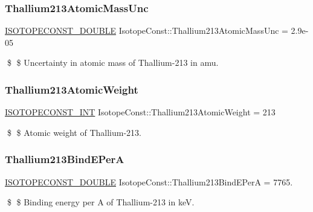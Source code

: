 \subsubsection{\texorpdfstring{Thallium213\+Atomic\+Mass\+Unc}{Thallium213AtomicMassUnc}}
{\footnotesize\ttfamily \mbox{\hyperlink{group___isotope_const-_macros_ga8f45a7272ce02c0b4c65c44636ed719a}{I\+S\+O\+T\+O\+P\+E\+C\+O\+N\+S\+T\+\_\+\+D\+O\+U\+B\+LE}} Isotope\+Const\+::\+Thallium213\+Atomic\+Mass\+Unc = 2.\+9e-\/05}

\$ \$ Uncertainty in atomic mass of Thallium-\/213 in amu. \mbox{\label{group___isotope_const-_thallium-_tl213_ga4a7ad94dc850814df657d40d5abe8f88}} 
\subsubsection{\texorpdfstring{Thallium213\+Atomic\+Weight}{Thallium213AtomicWeight}}
{\footnotesize\ttfamily \mbox{\hyperlink{group___isotope_const-_macros_ga5f18360b3e99483a35c32d789e62621c}{I\+S\+O\+T\+O\+P\+E\+C\+O\+N\+S\+T\+\_\+\+I\+NT}} Isotope\+Const\+::\+Thallium213\+Atomic\+Weight = 213}

\$ \$ Atomic weight of Thallium-\/213. \mbox{\label{group___isotope_const-_thallium-_tl213_ga40fa2023660bf8ea2247f623b7a4becc}} 
\subsubsection{\texorpdfstring{Thallium213\+Bind\+E\+PerA}{Thallium213BindEPerA}}
{\footnotesize\ttfamily \mbox{\hyperlink{group___isotope_const-_macros_ga8f45a7272ce02c0b4c65c44636ed719a}{I\+S\+O\+T\+O\+P\+E\+C\+O\+N\+S\+T\+\_\+\+D\+O\+U\+B\+LE}} Isotope\+Const\+::\+Thallium213\+Bind\+E\+PerA = 7765.}

\$ \$ Binding energy per A of Thallium-\/213 in keV. \mbox{\label{group___isotope_const-_thallium-_tl213_ga66a43ade27e282f01a11d721a3368d53}} 
